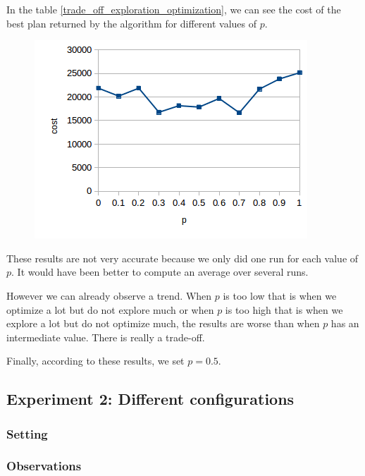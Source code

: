 \documentclass[11pt]{article}
\begin{document}
In the table \ref{trade_off_exploration_optimization}, we can see the cost of the best plan returned by the algorithm for different values of $p$.

\begin{figure}[h!]
\begin{center}
\includegraphics[scale=0.6]{trade_off_exploration_optimization.png}
\end{center}
\end{figure}

These results are not very accurate because we only did one run for each value of $p$. It would have been better to compute an average over several runs. 

However we can already observe a trend. When $p$ is too low that is when we optimize a lot but do not explore much or when $p$ is too high that is when we explore a lot but do not optimize much, the results are worse than when $p$ has an intermediate value. There is really a trade-off.

Finally, according to these results, we set $p = 0.5$.

\subsection{Experiment 2: Different configurations}

\subsubsection{Setting}

\subsubsection{Observations}
\end{document}

